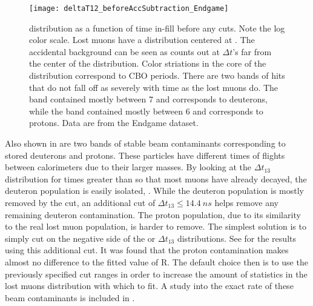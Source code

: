 
\begin{figure}[H]
\centering
\texttt{[image: deltaT12\_beforeAccSubtraction\_Endgame]}
\caption[Lost muon \DT distribution as a function of time in-fill]{\DT distribution as a function of time in-fill before any cuts. Note the log color scale. Lost muons have a \DT distribution centered at . The accidental background can be seen as counts out at $\Delta t$'s far from the center of the distribution. Color striations in the core of the distribution correspond to CBO periods. There are two bands of hits that do not fall off as severely with time as the lost muons do. The band contained mostly between 7 and  corresponds to deuterons, while the band contained mostly between 6 and  corresponds to protons. Data are from the Endgame dataset.}
\label{fig:deltaT12_AccSub}
\end{figure}


Also shown in  are two bands of stable beam contaminants corresponding to stored deuterons and protons. These particles have different times of flights between calorimeters due to their larger masses. By looking at the $\Delta t_{13}$ distribution for times greater than  so that most muons have already decayed, the deuteron population is easily isolated, . While the deuteron population is mostly removed by the \DT cut, an additional cut of $\Delta t_{13} \leq \SI{14.4}{ns}$ helps remove any remaining deuteron contamination. The proton population, due to its similarity to the real lost muon population, is harder to remove. The simplest solution is to simply cut on the negative side of the \DT or $\Delta t_{13}$ distributions. See  for the results using this additional cut. It was found that the proton contamination makes almost no difference to the fitted value of R. The default choice then is to use the previously specified cut ranges in order to increase the amount of statistics in the lost muons distribution with which to fit. A study into the exact rate of these beam contaminants is included in .



